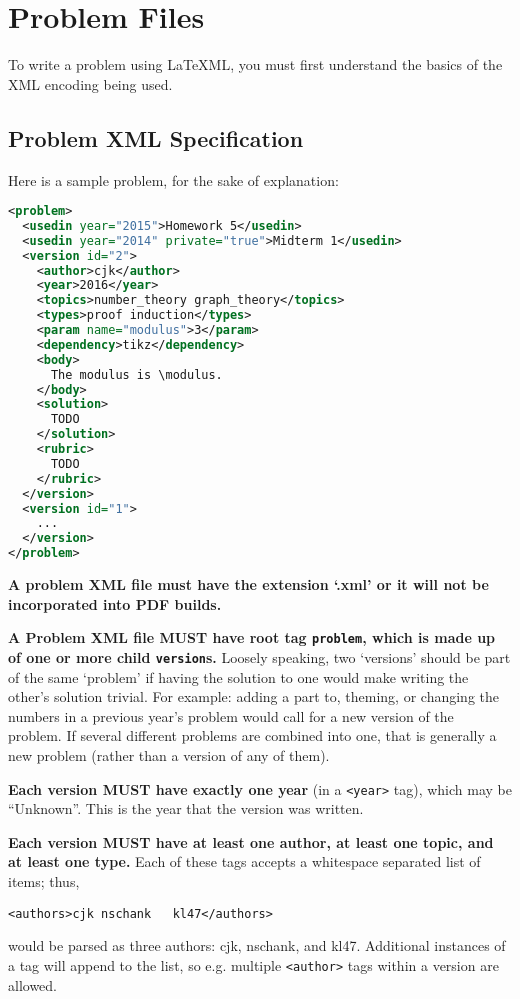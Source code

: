 \section{Problem Files}
  To write a problem using \LaTeX ML, you must first understand the basics of the XML encoding being used.
  
  \subsection{Problem XML Specification}
    Here is a sample problem, for the sake of explanation:
    \begin{mdframed}
      \begin{lstlisting}[language=XML,columns=fullflexible,breaklines=true]
<problem>
  <usedin year="2015">Homework 5</usedin>
  <usedin year="2014" private="true">Midterm 1</usedin>
  <version id="2">
    <author>cjk</author>
    <year>2016</year>
    <topics>number_theory graph_theory</topics>
    <types>proof induction</types>
    <param name="modulus">3</param>
    <dependency>tikz</dependency>
    <body>
      The modulus is \modulus.
    </body>
    <solution>
      TODO
    </solution>
    <rubric>
      TODO
    </rubric>
  </version>
  <version id="1">
    ...
  </version>
</problem>
      \end{lstlisting}
    \end{mdframed}
    
    \textbf{A problem XML file must have the extension `.xml' or it will not be incorporated into PDF builds.}
    
    \textbf{A Problem XML file MUST have root tag \texttt{problem}, which is made up of one or more child \texttt{version}s.} Loosely speaking, two `versions' should be part of the same `problem' if having the solution to one would make writing the other's solution trivial. For example: adding a part to, theming, or changing the numbers in a previous year's problem would call for a new version of the problem. If several different problems are combined into one, that is generally a new problem (rather than a version of any of them).
    
    \textbf{Each version MUST have exactly one year} (in a \texttt{<year>} tag), which may be ``Unknown''. This is the year that the version was written.
    
    \textbf{Each version MUST have at least one author, at least one topic, and at least one type.} Each of these tags accepts a whitespace separated list of items; thus,
    \begin{center}
      \texttt{<authors>cjk nschank\ \ \ kl47</authors>}
    \end{center}
    would be parsed as three authors: cjk, nschank, and kl47. Additional instances of a tag will append to the list, so e.g. multiple \texttt{<author>} tags within a version are allowed.
    
